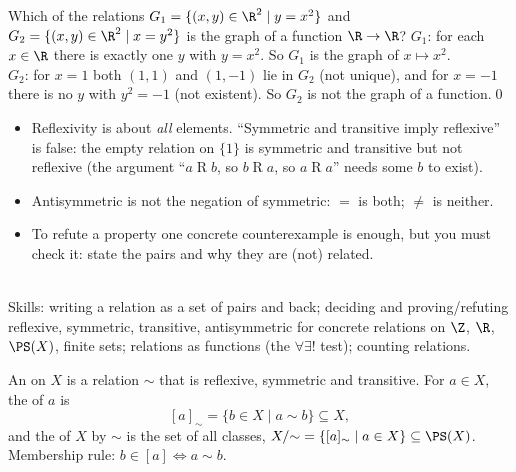\begin{hexample}[is it a function?]
Which of the relations $G_1=\{(x,y)\in\R^2\mid y=x^2\}$ and $G_2=\{(x,y)\in\R^2\mid x=y^2\}$ is the graph of a function $\R\to\R$?
\solution
$G_1$: for each $x\in\R$ there is exactly one $y$ with $y=x^2$. So $G_1$ is the graph of $x\mapsto x^2$.\\
$G_2$: for $x=1$ both $(1,1)$ and $(1,-1)$ lie in $G_2$ (not unique), and for $x=-1$ there is no $y$ with $y^2=-1$ (not existent). So $G_2$ is not the graph of a function.\qed
\end{hexample}

\begin{warn}
\begin{itemize}
\item Reflexivity is about \emph{all} elements. ``Symmetric and transitive imply reflexive'' is false: the empty relation on $\{1\}$ is symmetric and transitive but not reflexive (the argument ``$a\mathrel Rb$, so $b\mathrel Ra$, so $a\mathrel Ra$'' needs some $b$ to exist).
\item Antisymmetric is not the negation of symmetric: $=$ is both; $\neq$ is neither.
\item To refute a property one concrete counterexample is enough, but you must check it: state the pairs and why they are (not) related.
\end{itemize}
\end{warn}

\begin{planning}[5.1]
\quad {}\\[3pt]
Skills: writing a relation as a set of pairs and back; deciding and proving/refuting reflexive, symmetric, transitive, antisymmetric for concrete relations on $\Z$, $\R$, $\PS(X)$, finite sets; relations as functions (the $\forall\exists!$ test); counting relations.
\end{planning}


\begin{key}
An  on $X$ is a relation $\sim$ that is reflexive, symmetric and transitive. For $a\in X$, the  of $a$ is
\[
[a]_\sim=\{b\in X\mid a\sim b\}\subseteq X,
\]
and the  of $X$ by $\sim$ is the set of all classes, $X/{\sim}=\{[a]_\sim\mid a\in X\}\subseteq\PS(X)$. Membership rule: $b\in[a]\Leftrightarrow a\sim b$.
\end{key}

